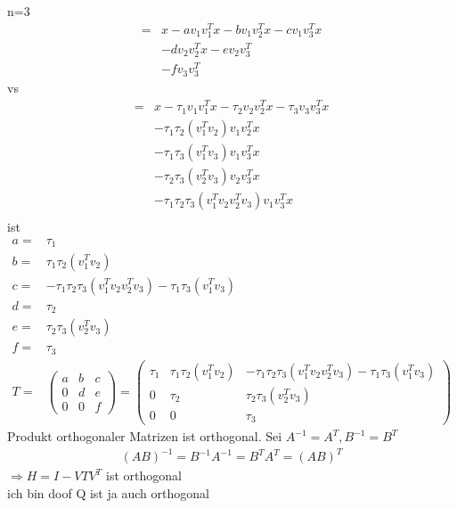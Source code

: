 \newpage
n=3
\begin{align*}
	=& x - a v_1 v_1^T x - b v_1 v_2^T x - c v_1 v_3^T x \\
	& - d v_2 v_2^T x - e v_2 v_3^T \\
	& - f v_3 v_3^T
\end{align*}
vs
\begin{align*}
	= &x - \tau_1 v_1 v_1^Tx - \tau_2 v_2 v_2^Tx - \tau_3 v_3 v_3^Tx \\
	&- \tau_1 \tau_2  (v_1^T v_2) v_1  v_2^T x\\
	&- \tau_1 \tau_3  (v_1^T v_3) v_1  v_3^T x\\
	&- \tau_2 \tau_3  (v_2^T v_3) v_2  v_3^T x\\
	&- \tau_1 \tau_2  \tau_3 (v_1^T v_2 v_2^T v_3) v_1  v_3^T x \\
\end{align*}
ist
\begin{align*}
	a =& \tau_1\\
	b =& \tau_1 \tau_2 (v_1^T v_2 ) \\
	c =& - \tau_1 \tau_2  \tau_3 (v_1^T v_2 v_2^T v_3) - \tau_1 \tau_3  (v_1^T v_3)\\
	d =& \tau_2 \\
	e =&  \tau_2 \tau_3  (v_2^T v_3)\\
    f =& \tau_3\\
	T =&
	\begin{pmatrix}
	a & b & c\\ 
	0 & d & e\\
	0 & 0 & f
	\end{pmatrix} =
	\begin{pmatrix}
		\tau_1 & \tau_1 \tau_2 (v_1^T v_2 ) & - \tau_1 \tau_2  \tau_3 (v_1^T v_2 v_2^T v_3) - \tau_1 \tau_3  (v_1^T v_3)\\ 
		0 & \tau_2 &  \tau_2 \tau_3  (v_2^T v_3)\\
		0 & 0 & \tau_3
	\end{pmatrix}
\end{align*}
Produkt orthogonaler Matrizen ist orthogonal. Sei $A^{-1} = A^T, B^{-1} = B^T$
\begin{align*}
	(AB)^{-1} = B^{-1}A^{-1} = B^TA^T = (AB)^T
\end{align*}
$\Rightarrow H=I-VTV^T$ ist orthogonal\\
ich bin doof Q ist ja auch orthogonal